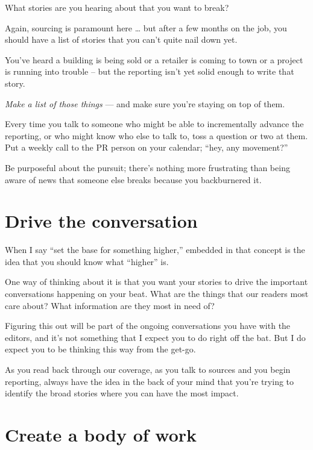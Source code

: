\documentclass[
  11pt,
  american,
  letterpaperpaper,
  extrafontsizes,onecolumn,openright
  ]{memoir}
\begin{document}
What stories are you hearing about that you want to break?

Again, sourcing is paramount here \ldots{} but after a few months on the job, you should have a list of stories that you can't quite nail down yet.

You've heard a building is being sold or a retailer is coming to town or a project is running into trouble -- but the reporting isn't yet solid enough to write that story.

\emph{Make a list of those things} --- and make sure you're staying on top of them.

Every time you talk to someone who might be able to incrementally advance the reporting, or who might know who else to talk to, toss a question or two at them. Put a weekly call to the PR person on your calendar; \enquote{hey, any movement?}

Be purposeful about the pursuit; there's nothing more frustrating than being aware of news that someone else breaks because you backburnered it.

\hypertarget{drive-the-conversation}{%
\section*{Drive the conversation}\label{drive-the-conversation}}

When I say \enquote{set the base for something higher,} embedded in that concept is the idea that you should know what \enquote{higher} is.

One way of thinking about it is that you want your stories to drive the important conversations happening on your beat. What are the things that our readers most care about? What information are they most in need of?

Figuring this out will be part of the ongoing conversations you have with the editors, and it's not something that I expect you to do right off the bat. But I do expect you to be thinking this way from the get-go.

As you read back through our coverage, as you talk to sources and you begin reporting, always have the idea in the back of your mind that you're trying to identify the broad stories where you can have the most impact.

\hypertarget{create-a-body-of-work}{%
\section*{Create a body of work}\label{create-a-body-of-work}}
\end{document}
